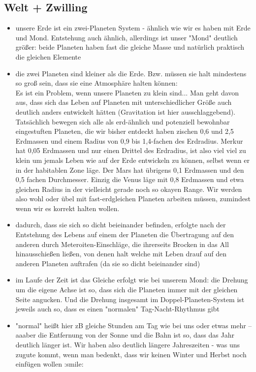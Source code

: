 \subsection{Welt + Zwilling}
\begin{itemize}
	\item unsere Erde ist ein zwei-Planeten System - ähnlich wie wir es haben mit Erde und Mond. Entstehung auch ähnlich, allerdings ist unser "Mond" deutlich größer: beide Planeten haben fast die gleiche Masse und natürlich praktisch die gleichen Elemente
	\item die zwei Planeten sind kleiner als die Erde. Bzw. müssen sie halt mindestens so groß sein, dass sie eine Atmosphäre halten können: \\
	Es ist ein Problem, wenn unsere Planeten zu klein sind... Man geht davon aus, dass sich das Leben auf Planeten mit unterschiedlicher Größe auch deutlich anders entwickelt hätten (Gravitation ist hier ausschlaggebend). Tatsächlich bewegen sich alle als erd-ähnlich und potenziell bewohnbar eingestuften Planeten, die wir bisher entdeckt haben zischen 0,6 und 2,5 Erdmassen und einem Radius von 0,9 bis 1,4-fachen des Erdradius. Merkur hat 0,05 Erdmassen und nur einen Drittel des Erdradius, ist also viel viel zu klein um jemals Leben wie auf der Erde entwickeln zu können, selbst wenn er in der habitablen Zone läge. Der Mars hat übrigens 0,1 Erdmassen und den 0,5 fachen Durchmesser. Einzig die Venus läge mit 0,8 Erdmassen und etwa gleichen Radius in der vielleicht gerade noch so okayen Range. Wir werden also wohl oder übel mit fast-erdgleichen Planeten arbeiten müssen, zumindest wenn wir es korrekt halten wollen.
	\item dadurch, dass sie sich so dicht beieinander befinden, erfolgte nach der Entstehung des Lebens auf einem der Planeten die Übertragung auf den anderen durch Meteroiten-Einschläge, die ihrerseits Brocken in das All hinausschießen ließen, von denen halt welche mit Leben drauf auf den anderen Planeten auftrafen (da sie so dicht beieinander sind)
	\item im Laufe der Zeit ist das Gleiche erfolgt wie bei unserem Mond: die Drehung um die eigene Achse ist so, dass sich die Planeten immer mit der gleichen Seite angucken. Und die Drehung insgesamt im Doppel-Planeten-System ist jeweils auch so, dass es einen "normalen" Tag-Nacht-Rhythmus gibt
	\item "normal" heißt hier zB gleiche Stunden am Tag wie bei uns oder etwas mehr -- aaaber die Entfernung von der Sonne und die Bahn ist so, dass das Jahr deutlich länger ist. Wir haben also deutlich längere Jahreszeiten - was uns zugute kommt, wenn man bedenkt, dass wir keinen Winter und Herbst noch einfügen wollen :smile:
\end{itemize}

